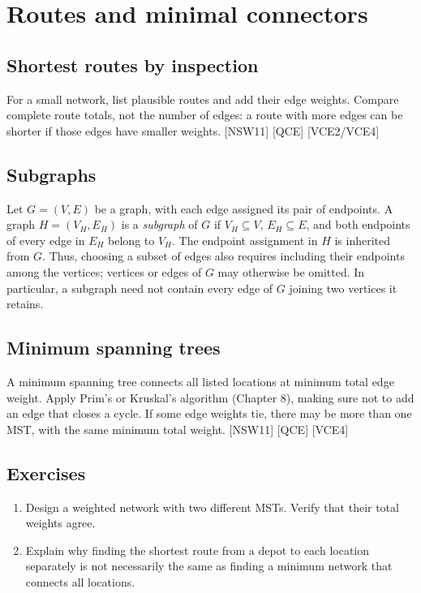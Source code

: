 \chapter{Routes and minimal connectors}
\section{Shortest routes by inspection}
For a small network, list plausible routes and add their edge weights. Compare complete route totals, not the number of edges: a route with more edges can be shorter if those edges have smaller weights. [NSW11] [QCE] [VCE2/VCE4]

\section{Subgraphs}
Let $G=(V,E)$ be a graph, with each edge assigned its pair of endpoints. A graph $H=(V_H,E_H)$ is a \emph{subgraph} of $G$ if $V_H\subseteq V$, $E_H\subseteq E$, and both endpoints of every edge in $E_H$ belong to $V_H$. The endpoint assignment in $H$ is inherited from $G$. Thus, choosing a subset of edges also requires including their endpoints among the vertices; vertices or edges of $G$ may otherwise be omitted. In particular, a subgraph need not contain every edge of $G$ joining two vertices it retains.

\section{Minimum spanning trees}
A minimum spanning tree connects all listed locations at minimum total edge weight. Apply Prim's or Kruskal's algorithm (Chapter 8), making sure not to add an edge that closes a cycle. If some edge weights tie, there may be more than one MST, with the same minimum total weight. [NSW11] [QCE] [VCE4]

\section*{Exercises}
\begin{enumerate}
\item Design a weighted network with two different MSTs. Verify that their total weights agree.
\item Explain why finding the shortest route from a depot to each location separately is not necessarily the same as finding a minimum network that connects all locations.
\end{enumerate}
